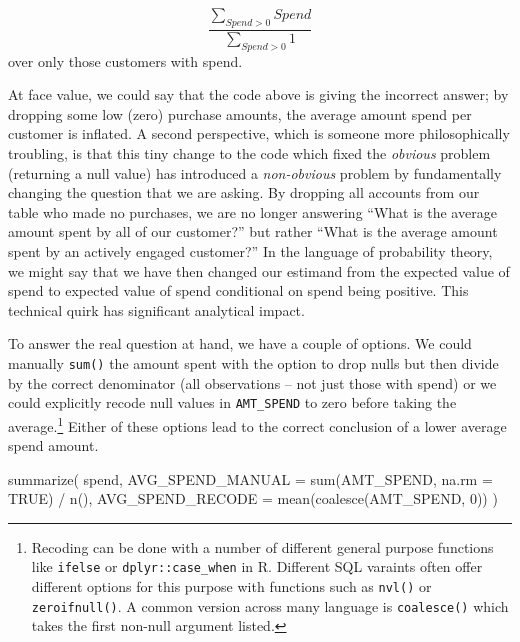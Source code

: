 \documentclass[
]{krantz}
\makeatletter
\newenvironment{Shaded}{\begin{snugshade}}{\end{snugshade}}
\newcommand{\AttributeTok}[1]{\textcolor[rgb]{0.61,0.61,0.61}{#1}}
\newcommand{\ConstantTok}[1]{\textcolor[rgb]{0,0,0}{#1}}
\newcommand{\DecValTok}[1]{\textcolor[rgb]{0.06,0.06,0.06}{#1}}
\newcommand{\FunctionTok}[1]{\textcolor[rgb]{0,0,0}{#1}}
\newcommand{\NormalTok}[1]{#1}
\newcommand{\SpecialCharTok}[1]{\textcolor[rgb]{0,0,0}{#1}}
\newenvironment{kframe}{%
\medskip{}
\setlength{\fboxsep}{.8em}
 \def\at@end@of@kframe{}%
 \ifinner\ifhmode%
  \def\at@end@of@kframe{\end{minipage}}%
  \begin{minipage}{\columnwidth}%
 \fi\fi%
 \def\FrameCommand##1{\hskip\@totalleftmargin \hskip-\fboxsep
 \colorbox{shadecolor}{##1}\hskip-\fboxsep
     \hskip-\linewidth \hskip-\@totalleftmargin \hskip\columnwidth}%
 \MakeFramed {\advance\hsize-\width
   \@totalleftmargin\z@ \linewidth\hsize
   \@setminipage}}%
 {\par\unskip\endMakeFramed%
 \at@end@of@kframe}
\renewenvironment{Shaded}{\begin{kframe}}{\end{kframe}}
\makeatother
\begin{document}
\[ \frac{ \sum_{Spend > 0} Spend }{\sum_{Spend > 0} 1} \] over only those customers with spend.

At face value, we could say that the code above is giving the incorrect answer; by dropping some low (zero) purchase amounts, the average amount spend per customer is inflated.
A second perspective, which is someone more philosophically troubling, is that this tiny change to the code which fixed the \emph{obvious} problem (returning a null value) has introduced a \emph{non-obvious} problem by fundamentally changing the question that we are asking.
By dropping all accounts from our table who made no purchases, we are no longer answering ``What is the average amount spent by all of our customer?'' but rather ``What is the average amount spent by an actively engaged customer?''
In the language of probability theory, we might say that we have then changed our estimand from the expected value of spend to expected value of spend conditional on spend being positive.
This technical quirk has significant analytical impact.

To answer the real question at hand, we have a couple of options.
We could manually \texttt{sum()} the amount spent with the option to drop nulls but then divide by the correct denominator (all observations -- not just those with spend) or we could explicitly recode null values in \texttt{AMT\_SPEND} to zero before taking the average.\footnote{Recoding can be done with a number of different general purpose functions like \texttt{ifelse} or \texttt{dplyr::case\_when} in R. Different SQL varaints often offer different options for this purpose with functions such as \texttt{nvl()} or \texttt{zeroifnull()}. A common version across many language is \texttt{coalesce()} which takes the first non-null argument listed.}
Either of these options lead to the correct conclusion of a lower average spend amount.

\begin{Shaded}
\begin{Highlighting}[]
\FunctionTok{summarize}\NormalTok{(}
\NormalTok{    spend,}
    \AttributeTok{AVG\_SPEND\_MANUAL =} \FunctionTok{sum}\NormalTok{(AMT\_SPEND, }\AttributeTok{na.rm =} \ConstantTok{TRUE}\NormalTok{) }\SpecialCharTok{/} \FunctionTok{n}\NormalTok{(),}
    \AttributeTok{AVG\_SPEND\_RECODE =} \FunctionTok{mean}\NormalTok{(}\FunctionTok{coalesce}\NormalTok{(AMT\_SPEND, }\DecValTok{0}\NormalTok{))}
\NormalTok{  )}
\end{Highlighting}
\end{Shaded}
\end{document}
